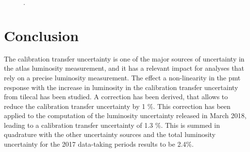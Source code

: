 \begin{figure}[htbp]
\centering
{}
\caption{ . }
\label{fig:apppmt:othersyst}
\end{figure}


\section{Conclusion}

The calibration transfer uncertainty is one of the major sources of uncertainty in the \gls{atlas} luminosity 
measurement, and it has a relevant impact for analyses that rely on a precise luminosity measurement. 
The effect a non-linearity in the \gls{pmt} response with the increase in luminosity in the calibration transfer uncertainty from 
\gls{tilecal} has been studied. 
A correction has been derived, that allows to reduce the calibration transfer uncertainty by 1 \%.
This correction has been applied to the computation of the luminosity uncertainty released in March 2018, 
leading to a calibration transfer uncertainty of 1.3 \%. 
This is summed in quadrature with the other uncertainty sources and 
the total luminosity uncertainty for the 2017 data-taking periods results to be 2.4\%. 




